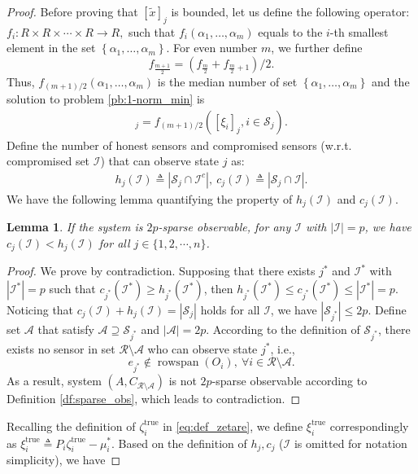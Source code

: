 \documentclass{ieeetrans}   %
\newcommand{\Ac}{{\mathcal{A}}}
\newcommand{\Ic}{{\mathcal{I}}}
\newcommand{\Rc}{{\mathcal{R}}}
\newcommand{\Sc}{{\mathcal{S}}}
\newcommand{\re}{\text{true}}
\DeclareMathOperator{\rs}{{rowspan}}
\newtheorem{lemma}{\textbf{Lemma}}
\newtheorem*{proof}{\textbf{Proof}}
\begin{document}
\begin{proof}
	Before proving that $[\tilde{x}]_j$ is bounded, let us define the following operator: $f_{i}: R \times R \times \cdots \times R \rightarrow R,$ such that $f_{i}\left(\alpha_{1}, \ldots, \alpha_{m}\right)$ equals to the $i$-th smallest element in the set $\left\{\alpha_{1}, \ldots, \alpha_{m}\right\} .$ For even number $m$, we further define 
	$$f_{\frac{m+1}{2}} = \left(f_{\frac{m}{2}} + f_{\frac{m}{2}+1}\right)/2.$$ 
	Thus, $f_{(m+1)/2}\left(\alpha_{1}, \ldots, \alpha_{m}\right)$ is the median number of set $\left\{\alpha_{1}, \ldots, \alpha_{m}\right\}$ and the solution to problem \eqref{pb:1-norm_min} is
	\begin{align*}
		[\tilde{x}]_j = f_{(m+1)/2}\left([\xi_i]_j, i\in\Sc_j\right).
	\end{align*}
	Define the number of honest sensors and compromised sensors (w.r.t. compromised set $\Ic$) that can observe state $j$ as:
	\begin{align*}
		h_j(\Ic)\triangleq |\Sc_j\cap \Ic^c|, \
		c_j(\Ic)\triangleq |\Sc_j\cap \Ic|.
	\end{align*}
	We have the following lemma quantifying the property of $h_j(\Ic)$ and $c_j(\Ic)$.  
	\begin{lemma}\label{lm:cj<hj}
		If the system is $2p$-sparse observable, for any $\Ic$ with $|\Ic|=p$, we have $c_j(\Ic)<h_j(\Ic)$ for all $j\in\{1,2,\cdots,n\}$.
	\end{lemma}
	\begin{proof}
		We prove by contradiction. Supposing that there exists $j^*$ and $\Ic^*$ with $|\Ic^*|=p$ such that $ c_{j^*}(\Ic^*)\geq h_{j^*}(\Ic^*)$, then
		$h_{j^*}(\Ic^*)\leq c_{j^*}(\Ic^*)\leq |\Ic^*|=p$. Noticing that $c_j(\Ic)+h_j(\Ic)=|\Sc_j|$ holds for all $\Ic$, we have $|\Sc_{j^*}|\leq 2p$. 
		Define set $\Ac$ that satisfy $\Ac\supseteq\Sc_{j^*}$ and $|\Ac|=2p$.
		According to the definition of $\Sc_{j^*}$, there exists no sensor in set $\Rc\setminus \Ac$ who can observe state $j^*$, i.e.,
		\begin{equation*}
			e_{j^*}\notin \rs(O_i),\ \forall i\in\Rc\setminus \Ac.
		\end{equation*}
		As a result, system $(A,C_{\Rc\setminus\Ac})$ is not $2p$-sparse observable according to Definition \ref{df:sparse_obs}, which leads to contradiction.
	\end{proof}
	Recalling the definition of $\zeta^{\re}_{i}$ in \eqref{eq:def_zetare}, we define $\xi^{\re}_{i}$ correspondingly as $\xi^\re_i\triangleq P_i\zeta^\re_{i}-\mu^*_{i} $.
	Based on the definition of $h_j,c_j$ ($\Ic$ is omitted for notation simplicity), we have

\end{proof}
\end{document}
